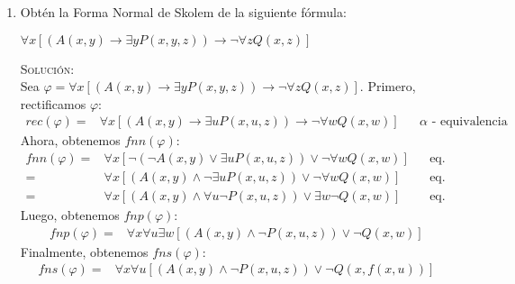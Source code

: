 \documentclass[letterpaper,11pt]{article}
\begin{document}
\begin{enumerate}
        \item Obtén la Forma Normal de Skolem de la siguiente fórmula:
        \begin{center}
            $\forall x[(A(x,y) \rightarrow \exists y P(x,y,z)) 
            \rightarrow \neg \forall z Q(x,z)]$
        \end{center}
        \textsc{Solución:} \\
        Sea $\varphi = \forall x[(A(x,y) \rightarrow \exists y P(x,y,z)) 
        \rightarrow \neg \forall z Q(x,z)]$. Primero, rectificamos $\varphi$:
        \begin{align*}
            rec(\varphi)
            =& \forall x[(A(x,y) \rightarrow \exists u P(x,u,z)) 
            \rightarrow \neg \forall w Q(x,w)]
            && \text{$\alpha$ - equivalencia}
        \end{align*}
        Ahora, obtenemos $fnn(\varphi)$:
        \begin{align*}
            fnn(\varphi) 
            =& \forall x[\neg (\neg A(x,y) \lor \exists u P(x,u,z)) \lor \neg 
            \forall w Q(x,w)]
            && \text{eq. lógica} \\
            =& \forall x[(A(x,y) \land \neg \exists u P(x,u,z)) \lor \neg 
            \forall w Q(x,w)] 
            && \text{eq. lógica} \\
            =& \forall x[(A(x,y) \land \forall u \neg P(x,u,z)) \lor 
            \exists w \neg Q(x,w)]
            && \text{eq. lógica} 
        \end{align*}
        Luego, obtenemos $fnp(\varphi)$:
        \begin{align*}
            fnp(\varphi)
            =& \forall x \forall u \exists w[(A(x,y) \land \neg P(x,u,z)) \lor 
            \neg Q(x,w)] 
        \end{align*}
        Finalmente, obtenemos $fns(\varphi)$:
        \begin{align*}
            fns(\varphi) 
            =& \forall x \forall u[(A(x,y) \land \neg P(x,u,z)) \lor 
            \neg Q(x,f(x,u))] 
        \end{align*}


\end{enumerate}
\end{document}
